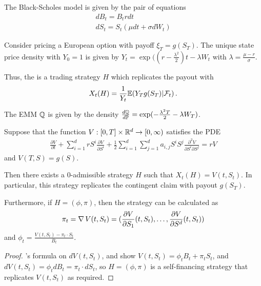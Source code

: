 \begin{defn}
  \label{sec:hedg-cont-claims-2}
  The Black-Scholes model is given by the pair of equations
  \begin{align}
    \label{eq:24}
    dB_{t} = B_{t} r dt \\
    dS_{t} = S_{t}(\mu dt + \sigma dW_{t})
  \end{align}

  Consider pricing a European option with payoff $\xi_{T} = g(S_{T})$.
  The unique state price density with $Y_{0} = 1$ is given by $Y_{t} =
  \exp((r - \frac{\lambda^{2}}{2})t - \lambda W_{t}$ with $\lambda =
  \frac{\mu - r}{\sigma}$.


  Thus, the is a trading strategy $H$ which replicates the payout with
  \begin{align}
    \label{eq:25}
    X_{t}(H) = \frac{1}{Y_{t}} \E{Y_{T} g(S_{T}) | \mathcal{F}_{t}}.
  \end{align}

  The EMM $\Q$ is given by the density $\frac{d\Q}{d\Prob} =
  \exp(-\frac{\lambda^{2} T}{2} - \lambda W_{T})$.
\end{defn}

\begin{thm}
  \label{sec:hedg-cont-claims-3}
  Suppose that the function $V: [0, T] \times \mathbb{R}^{d} \rightarrow [0,
  \infty)$ satisfies the PDE
  \begin{align}
    \label{eq:26}
    \frac{\partial V}{\partial t} + \sum_{i=1}^{d} r S^{i}
    \frac{\partial V}{\partial S^{i}} + \frac{1}{2} \sum_{i=1}^{d}
    \sum_{j=1}^{d} a_{i, j} S^{i} S^{j} \frac{\partial^{2} V}{\partial
      S^{i} \partial S^{j}} = rV
  \end{align} and $V(T, S) = g(S)$.

  Then there exists a $0$-admissible strategy $H$ such that $X_{t}(H)
  = V(t, S_{t})$. In particular, this strategy replicates the
  contingent claim with payout $g(S_{T})$.

  Furthermore, if $H = (\phi, \pi)$, then the strategy can be
  calculated as
  \begin{align}
    \label{eq:27}
    \pi_{t} = \operatorname*{\nabla} V(t, S_{t}) = (\frac{\partial V}{\partial
      S_{1}}(t, S_{t}), \dots, \frac{\partial V}{\partial S^{d}}(t,
    S_{t}))
  \end{align} and $\phi_{t} = \frac{V(t, S_{t}) - \pi_{t} \cdot
    S_{t}}{B_{t}}$.
\end{thm}

\begin{proof}
  \ito's formula on $dV(t, S_{t})$, and show $V(t, S_{t})= \phi_{t}
  B_{t} + \pi_{t} S_{t}$, and $dV(t, S_{t}) = \phi_{t} dB_{t} =
  \pi_{t} \cdot dS_{t}$, so $H = (\phi, \pi)$ is a self-financing
  strategy that replicates $V(t, S_{t})$ as required.
\end{proof}

